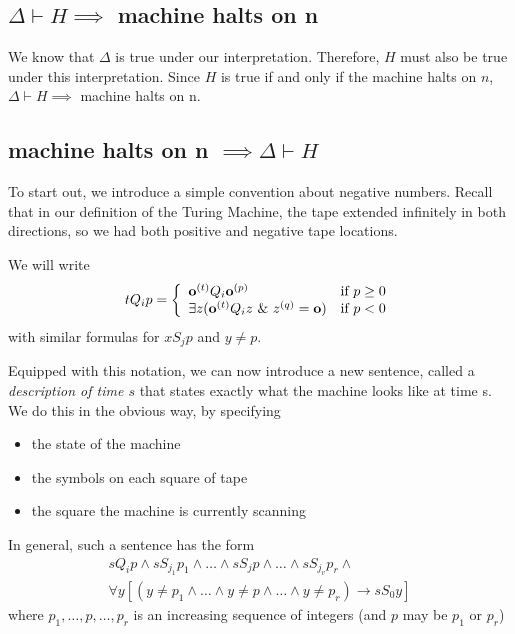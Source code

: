 \subsection{$\Delta \vdash H \implies$ machine halts on n}

We know that $\Delta$ is true under our interpretation.  Therefore, $H$ must also be true under this interpretation.
Since $H$ is true if and only if the machine halts on $n$, $\Delta \vdash H \implies$ machine halts on n.

\subsection{machine halts on n $\implies \Delta \vdash H$}

To start out, we introduce a simple convention about negative numbers. Recall that in our definition of the Turing Machine, the tape extended infinitely in both directions, so we had both positive and negative tape locations.

We will write
\[tQ_ip = \left\{\begin{array}{ll}  \mathbf{o}^{(t)}Q_i\mathbf{o}^{(p)} & \text{if }p \ge 0 \\ 
\exists z (\mathbf{o}^{(t)}Q_iz ~\&~ z^{(q)} = \mathbf{o}) & \text{if } p < 0 \end{array}\right.\]
with similar formulas for $xS_jp$ and $y \ne p$.

Equipped with this notation, we can now introduce a new sentence, called a \textit{description of time $s$} that states exactly what the machine looks like at time s. We do this in the obvious way, by specifying

\begin{itemize}
\item the state of the machine
\item the symbols on each square of tape
\item the square the machine is currently scanning
\end{itemize}

In general, such a sentence has the form
\begin{eqnarray*}\label{descAtTime}
sQ_ip \land s S_{j_1} p_1 \land \dots\land s S_j p \land \dots \land s S_{j_v}p_r \land \\
\forall y[(y\ne p_1\land\dots\land y\ne p \land \dots \land y\ne p_r ) \rightarrow s S_0y]
\end{eqnarray*}
where $p_1, \dots , p, \dots, p_r$ is an increasing sequence of integers (and $p$ may be $p_1$ or $p_r$)

